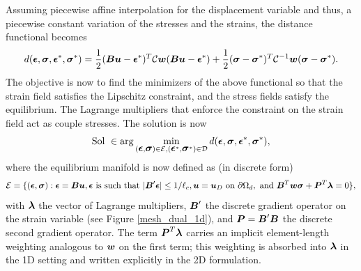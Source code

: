 \documentclass[10pt]{cas-sc}
\begin{document}
Assuming piecewise affine interpolation for the displacement variable and thus, a piecewise constant variation of the stresses and the strains, the distance functional becomes
\begin{equation}
	d(\bfeps,\bfsig,\bfeps^*,\bfsig^*) = \frac{1}{2}(\bfB \bfu - \bfeps^*)^T\mathcal{C}\bfw(\bfB \bfu - \bfeps^*) + \frac{1}{2}(\bfsig - \bfsig^*)^T\mathcal{C}^{-1}\bfw(\bfsig - \bfsig^*).
\end{equation}
The objective is now to find the minimizers of the above functional so that the strain field satisfies the Lipschitz constraint, and the stress fields satisfy the equilibrium. The Lagrange multipliers that enforce the constraint on the strain field act as couple stresses.  The solution is now
\begin{equation}
	\text{Sol } \in \arg \min_{(\bfeps,\bfsig) \in \mathcal{E}, (\bfeps^*,\bfsig^*) \in \mathcal{D}} d(\bfeps,\bfsig,\bfeps^*,\bfsig^*),
\end{equation}
where the equilibrium manifold is now defined as (in discrete form)
\begin{equation}
	\mathcal{E} = \{(\bfeps,\bfsig) : \bfeps = \bfB \bfu, \bfeps \text{ is such that } |\bfB' \bfeps|  \leq 1/{\ell_c} ,\bfu = \bfu_D \text{ on } \partial \Omega_d,
	\text{ and } \bfB ^T\bfw \bfsig + \bfP^T \bflam = 0     \},
\end{equation}
with $\bflam$ the vector of Lagrange multipliers, $\bfB'$ the discrete gradient operator on the strain variable (see Figure \ref{mesh_dual_1d}), and $\bfP = \bfB' \bfB$ the discrete second gradient operator. The term $\bfP^T \bflam$ carries an implicit element-length weighting analogous to $\bfw$ on the first term; this weighting is absorbed into $\bflam$ in the 1D setting and written explicitly in the 2D formulation. 
\end{document}
